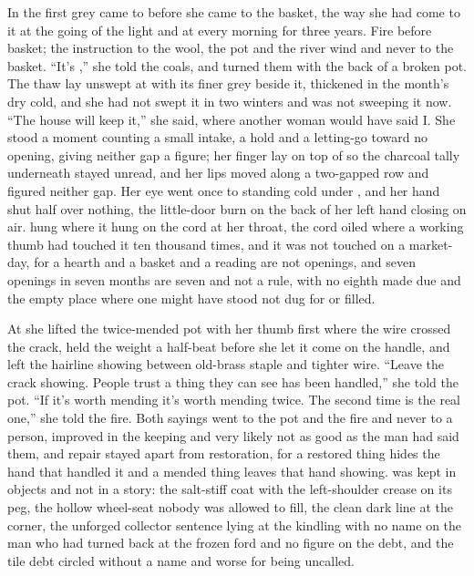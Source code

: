 In the first grey  came to  before she came to the basket, the way she had come to it at the going of the light and at every morning for three years. Fire before basket; the instruction to the wool, the pot and the river wind and never to the basket. “It's ,” she told the coals, and turned them with the back of a broken pot. The thaw lay unswept at  with its finer grey beside it, thickened in the month's dry cold, and she had not swept it in two winters and was not sweeping it now. “The house will keep it,” she said, where another woman would have said I. She stood a moment counting a small intake, a hold and a letting-go toward no opening, giving neither gap a figure; her finger lay on top of  so the charcoal tally underneath stayed unread, and her lips moved along a two-gapped row and figured neither gap. Her eye went once to  standing cold under , and her hand shut half over nothing, the little-door burn on the back of her left hand closing on air.  hung where it hung on the cord at her throat, the cord oiled where a working thumb had touched it ten thousand times, and it was not touched on a market-day, for a hearth and a basket and a reading are not openings, and seven openings in seven months are seven and not a rule, with no eighth made due and the empty place where one might have stood not dug for or filled.

At  she lifted the twice-mended pot with her thumb first where the wire crossed the crack, held the weight a half-beat before she let it come on the handle, and left the hairline showing between old-brass staple and tighter wire. “Leave the crack showing. People trust a thing they can see has been handled,” she told the pot. “If it's worth mending it's worth mending twice. The second time is the real one,” she told the fire. Both sayings went to the pot and the fire and never to a person, improved in the keeping and very likely not as good as the man had said them, and repair stayed apart from restoration, for a restored thing hides the hand that handled it and a mended thing leaves that hand showing.  was kept in objects and not in a story: the salt-stiff coat with the left-shoulder crease on its peg, the hollow wheel-seat nobody was allowed to fill, the clean dark line at the corner, the unforged collector sentence lying at the kindling with no name on the man who had turned back at the frozen ford and no figure on the debt, and the tile debt circled without a name and worse for being uncalled.

